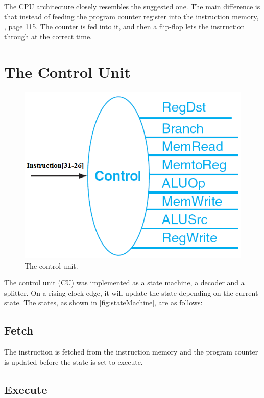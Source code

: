 The CPU architecture closely resembles the suggested one.  The main difference
is that instead of feeding the program counter register into the instruction
memory, \cite{lab-compendium}, page 115.
The counter is fed into it, and then a flip-flop lets the instruction through at the
correct time.

\section{The Control Unit}
\begin{figure}[ht]
    \centering
    \includegraphics[scale=0.3]{figures/controlunit.png}
    \caption{\label{fig:controlUnit}The control unit.}
\end{figure}

The control unit (CU) was implemented as a state machine, a decoder and a
splitter.  On a rising clock edge, it will update the state depending on the
current state. The states, as shown in \ref{fig:stateMachine}, are as follows:

\subsection{Fetch}

The instruction is fetched from the instruction memory and the program counter
is updated before the state is set to execute.

\subsection{Execute}

